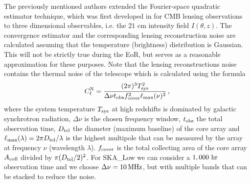 \documentclass{PoS}
\begin{document}
The previously mentioned authors extended the
Fourier-space quadratic estimator technique, which was first developed in 
\cite{Hu:2001tn} for CMB lensing  observations to three dimensional
observables, i.e. the $21$ cm intensity field $I(\theta,z)$.  
The  convergence
estimator and the corresponding lensing reconstruction noise are
calculated assuming that the temperature (brightness) distribution is
Gaussian. This will not be strictly true during the EoR, but serves as a reasonable approximation for these purposes. Note that the lensing reconstructions noise contains the thermal noise of the telescope which is calculated using the formula
\begin{equation}
C^{\rm N}_\ell = \frac{(2\pi)^3 T^2_{\rm sys}}{\Delta \nu t_{\rm obs} f^2_{\rm cover} \ell_{\rm max}(\nu)^2} \, ,
\end{equation} where the system temperature $T_{\rm sys}$ at high redshifts
 is dominated by galactic synchrotron radiation, $\Delta \nu$ is the chosen frequency window, $t_{\rm obs}$ the total observation time, $D_{\rm tel}$ the diameter (maximum baseline) of the core array and $\ell_{\rm max}(\lambda)=2\pi D_{\rm tel}/\lambda$ is the highest multipole that can be measured by the array at frequency $\nu$ (wavelength $\lambda$). $f_{\rm cover}$ is the total collecting area of the core array $A_{\rm coll}$ divided by $\pi(D_{\rm tel}/2)^2$. For SKA\_Low we can consider a $1,000~{\rm hr}$ observation time and we choose $\Delta \nu = 10 \, {\rm MHz}$, but with multiple bands that can be stacked to reduce the noise. 
 
\end{document}
